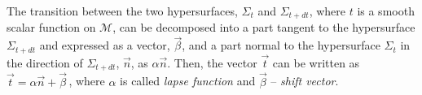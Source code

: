 The transition between the two hypersurfaces, $\Sigma_t$ and $\Sigma_{t+dt}$,
where $t$ is a smooth scalar function on $\mathcal{M}$, can be decomposed 
into a part tangent to the hypersurface $\Sigma_{t+dt}$ and expressed as a vector,
$\vec{\beta}$, and a part normal to the hypersurface $\Sigma_t$ in the direction of 
$\Sigma_{t+dt}$, $\vec{n}$, as $\alpha \vec{n}$.
%
Then, the vector $\vec{t}$ can be written as 
%
$\vec{t} = \alpha\vec{n}+\vec{\beta}\, $, 
%
where $\alpha$ is called \textit{lapse function} and $\vec{\beta}$ -- \textit{shift vector}.
%
%
%
% 

